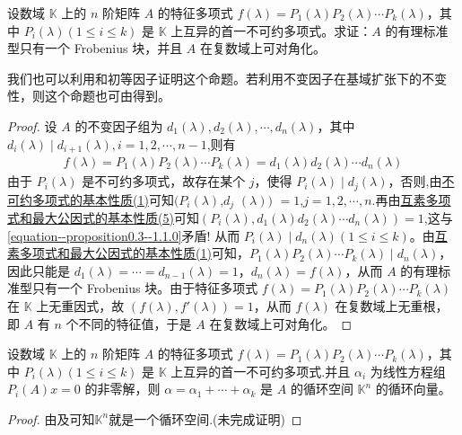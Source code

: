 \documentclass[../../main.tex]{subfiles}%
\begin{document}
\begin{proposition}\label{proposition:特征多项式在数域K上的不可约分解则在复数域上可对角化}
设数域 $\mathbb{K}$ 上的 $n$ 阶矩阵 $A$ 的特征多项式 $f(\lambda)=P_1(\lambda)P_2(\lambda)\cdots P_k(\lambda)$，其中 $P_i(\lambda) (1\leqslant  i\leqslant  k)$ 是 $\mathbb{K}$ 上互异的首一不可约多项式。求证：$A$ 的有理标准型只有一个 Frobenius 块，并且 $A$ 在复数域上可对角化。
\end{proposition}
\begin{remark}
我们也可以利用和初等因子证明这个命题。若利用不变因子在基域扩张下的不变性，则这个命题也可由得到。
\end{remark}
\begin{proof}
设 $A$ 的不变因子组为 $d_1(\lambda),d_2(\lambda),\cdots,d_n(\lambda)$，其中$d_{i}(\lambda)\mid d_{i+1}(\lambda),i=1,2,\cdots,n-1$,则有
\begin{align}\label{equation--proposition0.3--1.1.0}
f(\lambda)=P_1(\lambda)P_2(\lambda)\cdots P_k(\lambda)=d_1(\lambda)d_2(\lambda)\cdots d_n(\lambda)
\end{align}
由于 $P_i(\lambda)$ 是不可约多项式，故存在某个 $j$，使得 $P_i(\lambda)\mid d_j(\lambda)$，否则,由\hyperref[proposition:不可约多项式的基本性质]{不可约多项式的基本性质(1)}可知$(P_i(\lambda)$,$d_j$ $(\lambda))$ $=1$,$j=1,2,\cdots,n$.再由\hyperref[proposition:互素多项式和最大公因式的基本性质]{互素多项式和最大公因式的基本性质(5)}可知$(P_i(\lambda),d_1(\lambda)d_2(\lambda)\cdots d_n(\lambda))=1$,这与\eqref{equation--proposition0.3--1.1.0}矛盾!
从而 $P_i(\lambda)\mid d_n(\lambda) (1\leqslant  i\leqslant  k)$。由\hyperref[proposition:互素多项式和最大公因式的基本性质]{互素多项式和最大公因式的基本性质(1)}可知，$P_1(\lambda)P_2(\lambda)\cdots P_k(\lambda)\mid d_n(\lambda)$，因此只能是 $d_1(\lambda)=\cdots = d_{n - 1}(\lambda)=1$，$d_n(\lambda)=f(\lambda)$，从而 $A$ 的有理标准型只有一个 Frobenius 块。由于特征多项式 $f(\lambda)=P_1(\lambda)P_2(\lambda)\cdots P_k(\lambda)$ 在 $\mathbb{K}$ 上无重因式，故 $(f(\lambda),f'(\lambda)) = 1$，从而 $f(\lambda)$ 在复数域上无重根，即 $A$ 有 $n$ 个不同的特征值，于是 $A$ 在复数域上可对角化。
\end{proof}

\begin{corollary}
设数域 $\mathbb{K}$ 上的 $n$ 阶矩阵 $A$ 的特征多项式 $f(\lambda)=P_1(\lambda)P_2(\lambda)\cdots P_k(\lambda)$，其中 $P_i(\lambda) (1\leqslant  i\leqslant  k)$ 是 $\mathbb{K}$ 上互异的首一不可约多项式.并且 $\alpha_i$ 为线性方程组 $P_i(A)x = 0$ 的非零解，则 $\alpha=\alpha_1 + \cdots + \alpha_k$ 是 $A$ 的循环空间 $\mathbb{K}^n$ 的循环向量。
\end{corollary}
\begin{proof}
由及可知$\mathbb{K}^n$就是一个循环空间.(未完成证明)
\end{proof}
\end{document}
